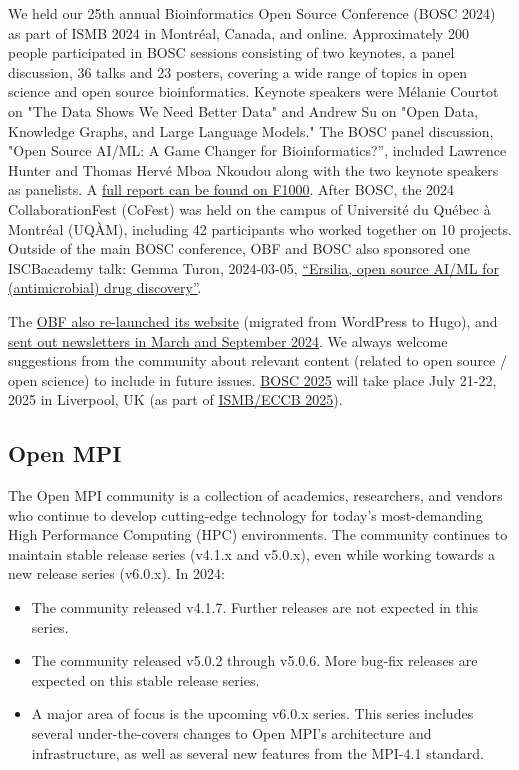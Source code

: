 \documentclass[a4paper]{report}
\begin{document}
We held our 25th annual Bioinformatics Open Source Conference (BOSC 2024) as part of ISMB 2024 in Montréal, Canada, and online. Approximately 200 people participated in BOSC sessions consisting of two keynotes, a panel discussion, 36 talks and 23 posters, covering a wide range of topics in open science and open source bioinformatics. Keynote speakers were Mélanie Courtot on "The Data Shows We Need Better Data" and Andrew Su on "Open Data, Knowledge Graphs, and Large Language Models." The BOSC panel discussion, "Open Source AI/ML: A Game Changer for Bioinformatics?”, included Lawrence Hunter and Thomas Hervé Mboa Nkoudou along with the two keynote speakers as panelists. A \href{https://f1000research.com/articles/13-1100}{full report can be found on F1000}. After BOSC, the 2024 CollaborationFest (CoFest) was held on the campus of Université du Québec à Montréal (UQÀM), including 42 participants who worked together on 10 projects. Outside of the main BOSC conference, OBF and BOSC also sponsored one ISCBacademy talk: Gemma Turon, 2024-03-05, \href{https://www.open-bio.org/2024/03/26/gemma-turon-iscbacademy-talk-video/}{“Ersilia, open source AI/ML for (antimicrobial) drug discovery”}.

The \href{https://www.open-bio.org/}{OBF also re-launched its website} (migrated from WordPress to Hugo), and \href{https://github.com/OBF/newsletter/tree/master/newsletters}{sent out newsletters in March and September 2024}. We always welcome suggestions from the community about relevant content (related to open source / open science) to include in future issues.
\href{https://www.open-bio.org/events/bosc-2025/}{BOSC 2025} will take place July 21-22, 2025 in Liverpool, UK (as part of \href{https://www.iscb.org/ismbeccb2025/home}{ISMB/ECCB 2025}).

\subsection{Open MPI}

The Open MPI community is a collection of academics, researchers, and vendors who continue to develop cutting-edge technology for today’s most-demanding High Performance Computing (HPC) environments.  The community continues to maintain stable release series (v4.1.x and v5.0.x), even while working towards a new release series (v6.0.x).
In 2024:

\begin{itemize}

\item The community released v4.1.7. Further releases are not expected in this series.

\item The community released v5.0.2 through v5.0.6.  More bug-fix releases are expected on this stable release series.

\item A major area of focus is the upcoming v6.0.x series. This series includes several under-the-covers changes to Open MPI’s architecture and infrastructure, as well as several new features from the MPI-4.1 standard.

\end{itemize}
\end{document}
